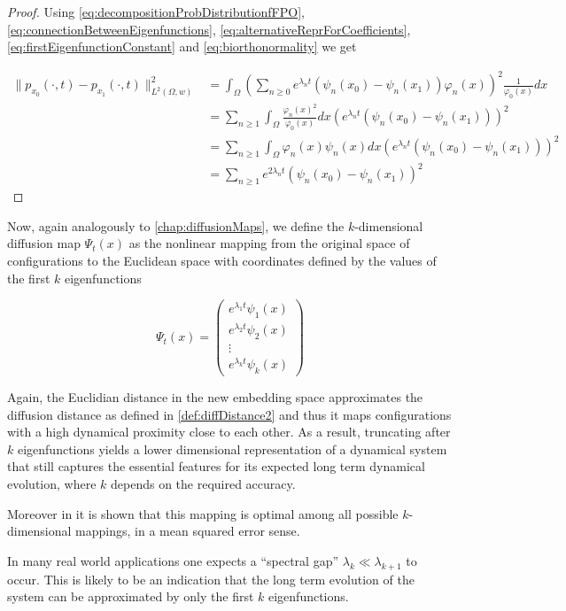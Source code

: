 \begin{proof}
Using \eqref{eq:decompositionProbDistributionfFPO}, \eqref{eq:connectionBetweenEigenfunctions}, \eqref{eq:alternativeReprForCoefficients}, \eqref{eq:firstEigenfunctionConstant} and \eqref{eq:biorthonormality} we get

\begin{equation*}\begin{aligned}
\|p_{x_0}(\cdot, t) - p_{x_1}(\cdot, t) \|_{L^2(\Omega, w)}^2 &=
\int_\Omega \left( \sum_{n\geq 0} e^{\lambda_n t}(\psi_n(x_0)-\psi_n(x_1)) \varphi_n(x)\right)^2\frac{1}{\varphi_0(x)}dx\\
&= \sum_{n\geq 1} \int_\Omega \frac{\varphi_n(x)^2}{\varphi_0(x)}dx \left(e^{\lambda_n t}(\psi_n(x_0)-\psi_n(x_1))\right)^2\\
&= \sum_{n\geq 1} \int_\Omega \varphi_n(x)\psi_n(x)dx \left(e^{\lambda_n t}(\psi_n(x_0)-\psi_n(x_1))\right)^2\\
&= \sum_{n\geq 1} e^{2 \lambda_n t}(\psi_n(x_0)-\psi_n(x_1))^2
\end{aligned}\end{equation*}
\end{proof}

Now, again analogously to \autoref{chap:diffusionMaps}, we define the $k$-dimensional diffusion map $\Psi_t(x)$ as the nonlinear mapping from the original space of configurations to the Euclidean space with coordinates defined by the values of the first $k$ eigenfunctions

\begin{definition}

\begin{equation*}
\Psi_t(x)=\begin{pmatrix}
  e^{\lambda_1 t}\psi_1(x) \\
  e^{\lambda_2 t}\psi_2(x) \\
  \vdots \\
  e^{\lambda_k t}\psi_k(x)
 \end{pmatrix}
\end{equation*}

\end{definition}

Again, the Euclidian distance in the new embedding space approximates the diffusion distance as defined in \ref{def:diffDistance2} and thus it maps configurations with a high dynamical proximity close to each other.
As a result, truncating after $k$ eigenfunctions yields a lower dimensional representation of a dynamical system that still captures the essential features for its expected long term dynamical evolution, where $k$ depends on the required accuracy.

Moreover in \cite{Nadler2008} it is shown that this mapping is optimal among all possible $k$-dimensional mappings, in a mean squared error sense.

In many real world applications one expects a ``spectral gap'' $\lambda_k\ll\lambda_{k+1}$ to occur. This is likely to be an indication that the long term evolution of the system can be approximated by only the first $k$ eigenfunctions.





